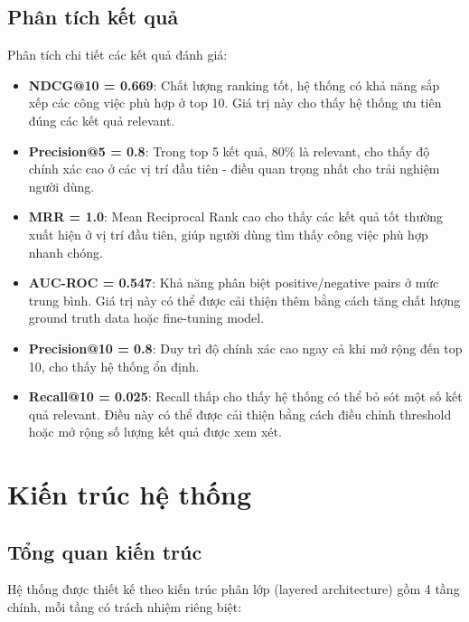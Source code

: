 \subsection{Phân tích kết quả}

Phân tích chi tiết các kết quả đánh giá:

\begin{itemize}
    \item \textbf{NDCG@10 = 0.669}: Chất lượng ranking tốt, hệ thống có khả năng sắp xếp các công việc phù hợp ở top 10. Giá trị này cho thấy hệ thống ưu tiên đúng các kết quả relevant.
    
    \item \textbf{Precision@5 = 0.8}: Trong top 5 kết quả, 80\% là relevant, cho thấy độ chính xác cao ở các vị trí đầu tiên - điều quan trọng nhất cho trải nghiệm người dùng.
    
    \item \textbf{MRR = 1.0}: Mean Reciprocal Rank cao cho thấy các kết quả tốt thường xuất hiện ở vị trí đầu tiên, giúp người dùng tìm thấy công việc phù hợp nhanh chóng.
    
    \item \textbf{AUC-ROC = 0.547}: Khả năng phân biệt positive/negative pairs ở mức trung bình. Giá trị này có thể được cải thiện thêm bằng cách tăng chất lượng ground truth data hoặc fine-tuning model.
    
    \item \textbf{Precision@10 = 0.8}: Duy trì độ chính xác cao ngay cả khi mở rộng đến top 10, cho thấy hệ thống ổn định.
    
    \item \textbf{Recall@10 = 0.025}: Recall thấp cho thấy hệ thống có thể bỏ sót một số kết quả relevant. Điều này có thể được cải thiện bằng cách điều chỉnh threshold hoặc mở rộng số lượng kết quả được xem xét.
\end{itemize}

\section{Kiến trúc hệ thống}

\subsection{Tổng quan kiến trúc}

Hệ thống được thiết kế theo kiến trúc phân lớp (layered architecture) gồm 4 tầng chính, mỗi tầng có trách nhiệm riêng biệt:

